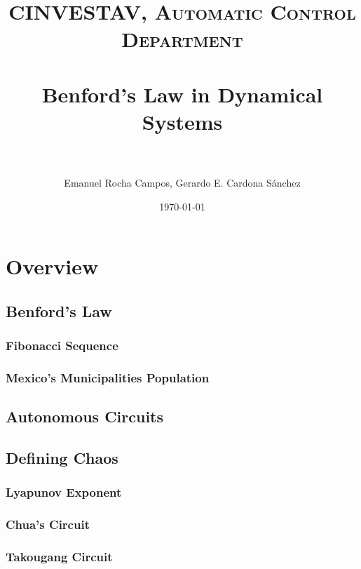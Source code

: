 \message{ !name(resultados.tex)}\documentclass[paper=a4, fontsize=11pt]{scrartcl} %
\title{	
\normalfont \normalsize 
\textsc{CINVESTAV, Automatic Control Department} \\ [25pt] %
\horrule{0.5pt} \\[0.4cm] %
\huge Benford's Law in Dynamical Systems \\ %
\horrule{2pt} \\[0.5cm] %
}
\author{Emanuel Rocha Campos, Gerardo E. Cardona S\'anchez} %
\date{\normalsize\today} %
\numberwithin{equation}{section} %
\numberwithin{figure}{section} %
\numberwithin{table}{section} %
\begin{document}


\maketitle %


\section{Overview}



\subsection{Benford's Law}

\subsubsection{Fibonacci Sequence}



 \subsubsection{Mexico's Municipalities Population}
 

\subsection{Autonomous Circuits}

\subsection{Defining Chaos}

\subsubsection{Lyapunov Exponent}


\subsubsection{Chua's Circuit}


\subsubsection{Takougang Circuit}

\end{document}

